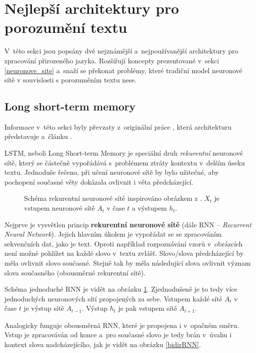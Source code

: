 \section{Nejlepší architektury pro porozumění textu}
V~této sekci jsou popsány dvě nejznámější a~nejpoužívanější architektury pro zpracování přirozeného jazyka. Rozšiřují koncepty prezentované v~sekci \ref{neuronove_site} a~snaží se překonat problémy, které tradiční model neuronové sítě v souvislosti s porozuměním textu nese.\par

\subsection{Long short-term memory}
\label{lstm}
Informace v~této sekci byly převzaty z~originální práce \cite{LSTM}, která architekturu představuje a~článku \cite{understandingLSTM}.\par
LSTM, neboli Long Short-term Memory je speciální druh \emph{rekurentní} neuronové sítě, který se částečně vypořádává s~problémem ztráty kontextu v~delším úseku textu. Jednoduše řečeno, při učení neuronové sítě by bylo užitečné, aby pochopení současné věty dokázala ovlivnit i věta předcházející.\par

\begin{figure}[hbt]
    \centering
	\caption{Schéma rekurentní neuronové sítě inspirováno obrázkem z \cite{understandingLSTM}. $X_t$ je vstupem neuronové sítě $A_t$ v čase $t$ a výstupem $h_t$.}
	\label{RNN}
\end{figure}

Nejprve je vysvětlen princip \textbf{rekurentní neuronové sítě} (dále RNN -- \textit{Recurrent Neural Network}).
Jejich hlavním úkolem je vypořádat se se zpracováním sekvenčních dat, jako je text. Oproti například rozpoznávání vzorů v~obrázcích není možné pohlížet na každé slovo v~textu zvlášť. Slovo/slova předcházející by měla ovlivnit slovo současné. Stejně tak by měla následující slova ovlivnit význam slova současného (obousměrné rekurentní sítě).\par
Schéma jednoduché RNN je vidět na obrázku \ref{RNN}. Zjednodušeně je to tedy více jednoduchých neuronových sítí propojených za sebe. Vstupem každé sítě $A_t$ v čase $t$ je výstup sítě $A_{t-1}$. Výstup $h_t$ je pak vstupem sítě $A_{t+1}$.\par
Analogicky funguje obousměrná RNN, které je propojena i v~opačném směru. Vstup je zpracováván od konce a~pro současné slovo je tedy brán v~úvahu i kontext slova nadcházejícího, jak je vidět na obrázku \ref{bidirRNN}.\par

